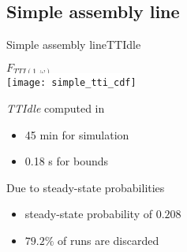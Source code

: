   \subsection{Simple assembly line}
    \begin{frame}{Simple assembly line}{TTIdle}
      \begin{center}
        $F_{TTI(1,\omega)}$\\
        \colorbox{white}{\texttt{[image: simple\_tti\_cdf]}}
      \end{center}
      
      \begin{minipage}{0.45\textwidth}
        \textit{TTIdle} computed in
        \begin{itemize}
          \item 45 min for simulation
          \item 0.18 s for bounds
        \end{itemize}
      \end{minipage}
      \begin{minipage}{0.5\textwidth}
        Due to steady-state probabilities
        \begin{itemize}
          \item steady-state probability of $0.208$
          \item $79.2\%$ of runs are discarded
        \end{itemize}
      \end{minipage}
    \end{frame}
    
